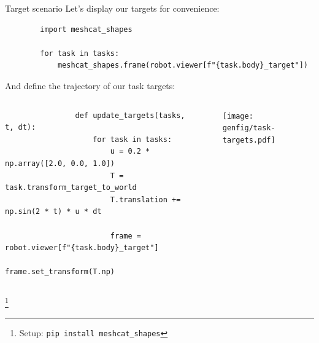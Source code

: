 \documentclass[9pt, aspectratio=43]{beamer}
\newcommand\blfootnote[1]{%
  \begingroup
  \renewcommand\thefootnote{}%
  \footnote{#1}%
  \addtocounter{footnote}{-1}%
  \endgroup
}
\begin{document}
\begin{frame}[fragile]{Target scenario}
    Let's display our targets for convenience:
    \begin{verbatim}
        import meshcat_shapes

        for task in tasks:
            meshcat_shapes.frame(robot.viewer[f"{task.body}_target"])
    \end{verbatim}
    And define the trajectory of our task targets:
    \begin{columns}
        \begin{column}{0.75\columnwidth}
            \begin{verbatim}
                def update_targets(tasks, t, dt):
                    for task in tasks:
                        u = 0.2 * np.array([2.0, 0.0, 1.0])
                        T = task.transform_target_to_world
                        T.translation += np.sin(2 * t) * u * dt

                        frame = robot.viewer[f"{task.body}_target"]
                        frame.set_transform(T.np)
            \end{verbatim}
        \end{column}
        \begin{column}{0.24\columnwidth}
            \begin{figure}
                \centering
                \texttt{[image: genfig/task-targets.pdf]}
            \end{figure}
        \end{column}
    \end{columns}
    \blfootnote{
        Setup: \texttt{pip install meshcat_shapes}
    }
\end{frame}
\end{document}
